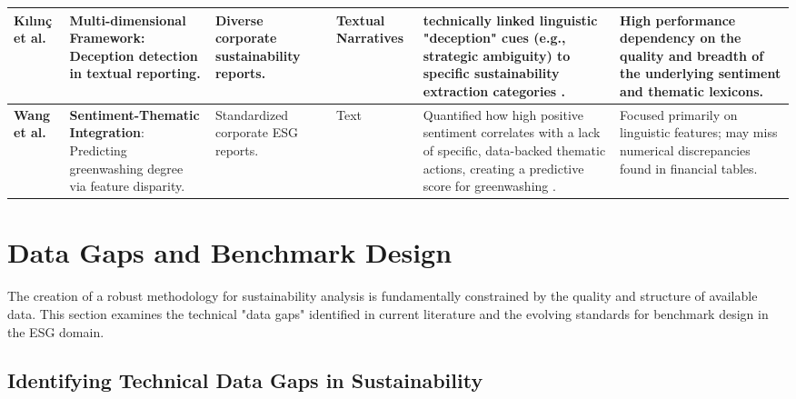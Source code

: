 \begin{landscape}
\begin{table}[p]
\begin{tabularx}{\linewidth}{|p{1.8cm}|p{3.5cm}|p{2.5cm}|p{1.8cm}|X|X|}
\textbf{Kılınç et al.}  \parencite{yavuz_k_l_n__64e32f80} & \textbf{Multi-dimensional Framework}: Deception detection in textual reporting. & Diverse corporate sustainability reports. & Textual Narratives & technically linked linguistic "deception" cues (e.g., strategic ambiguity) to specific sustainability extraction categories  \parencite{yavuz_k_l_n__64e32f80}. & High performance dependency on the quality and breadth of the underlying sentiment and thematic lexicons. \\ \hline
\textbf{Wang et al.}  \parencite{xiaojia_wang_02351a60} & \textbf{Sentiment-Thematic Integration}: Predicting greenwashing degree via feature disparity. & Standardized corporate ESG reports. & Text & Quantified how high positive sentiment correlates with a lack of specific, data-backed thematic actions, creating a predictive score for greenwashing  \parencite{xiaojia_wang_02351a60}. & Focused primarily on linguistic features; may miss numerical discrepancies found in financial tables. \\ \hline
\end{tabularx}
\end{table}
\end{landscape}

\section{ Data Gaps and Benchmark Design}

The creation of a robust methodology for sustainability analysis is fundamentally constrained by the quality and structure of available data. This section examines the technical "data gaps" identified in current literature and the evolving standards for benchmark design in the ESG domain.
\subsection{Identifying Technical Data Gaps in Sustainability}

